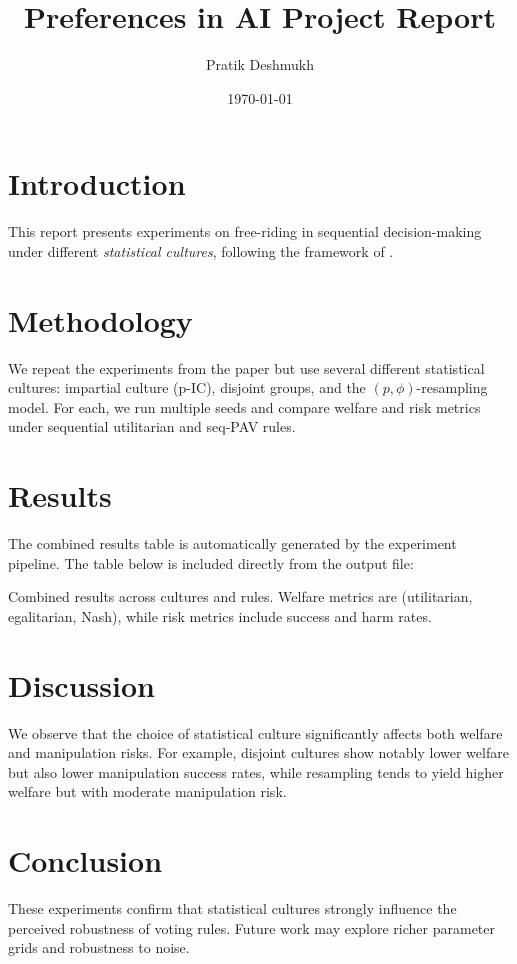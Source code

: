 \documentclass[11pt]{article}
\title{Preferences in AI Project Report}
\author{Pratik Deshmukh}
\date{\today}
\begin{document}
\maketitle

\section{Introduction}
This report presents experiments on free-riding in sequential decision-making
under different \emph{statistical cultures}, following the framework of
\cite{lackner2023freeriding}.

\section{Methodology}
We repeat the experiments from the paper but use several different statistical
cultures: impartial culture (p-IC), disjoint groups, and the $(p, \phi)$-resampling
model. For each, we run multiple seeds and compare welfare and risk metrics under
sequential utilitarian and seq-PAV rules.

\section{Results}
The combined results table is automatically generated by the experiment
pipeline. The table below is included directly from the output file:

\begin{table}[h!]
\centering
\resizebox{\textwidth}{!}{%

}
\caption{Combined results across cultures and rules. Welfare metrics are
(utilitarian, egalitarian, Nash), while risk metrics include success and harm
rates.}
\label{tab:combined}
\end{table}

\section{Discussion}
We observe that the choice of statistical culture significantly affects both
welfare and manipulation risks. For example, disjoint cultures show notably
lower welfare but also lower manipulation success rates, while resampling tends
to yield higher welfare but with moderate manipulation risk.

\section{Conclusion}
These experiments confirm that statistical cultures strongly influence the
perceived robustness of voting rules. Future work may explore richer parameter
grids and robustness to noise.
\end{document}
